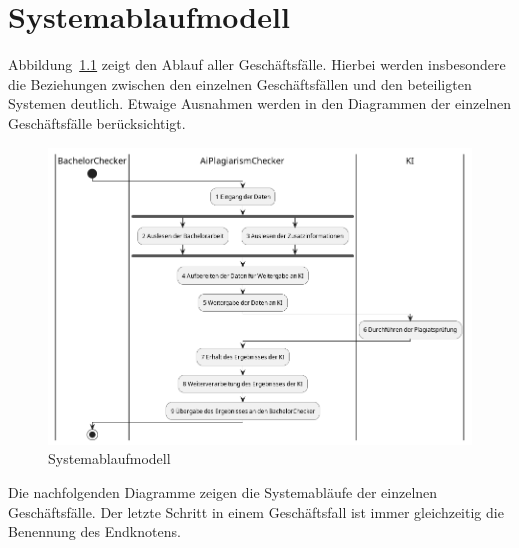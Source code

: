 \chapter{Systemablaufmodell}\label{ch:systemablaufmodell}

Abbildung~\ref{fig:systemablaufmodell} zeigt den Ablauf aller Geschäftsfälle.
Hierbei werden insbesondere die Beziehungen zwischen den einzelnen Geschäftsfällen und den beteiligten Systemen deutlich.
Etwaige Ausnahmen werden in den Diagrammen der einzelnen Geschäftsfälle berücksichtigt.

\begin{figure}[H]
    \centering
    \includegraphics[width=1\textwidth]{images/diagrams/businessProcessDiagram/Systemablaufmodell}
    \caption{Systemablaufmodell}
    \label{fig:systemablaufmodell}
\end{figure}

\newpage Die nachfolgenden Diagramme zeigen die Systemabläufe der einzelnen Geschäftsfälle.
Der letzte Schritt in einem Geschäftsfall ist immer gleichzeitig die Benennung des Endknotens.

